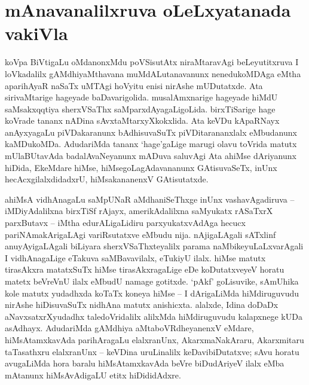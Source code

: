\makeatletter
\def\@makechapterhead#1{%
  \vspace*{10\p@}%
{\fontsize{13pt}{13pt}\selectfont\raggedright{\bf  bArfbarA vADfR jAkfsanf}\par}
\vspace*{25\p@}%
  {\parindent \z@ \centering \normalfont
    \ifnum \c@secnumdepth >\m@ne
      \if@mainmatter
        {\LARGE\bfseries  #1}\par\nobreak
	\vskip 4pt
      \fi
    \fi
\smallskip 

 \vskip 10\p@  
{\fontsize{12pt}{12pt}\selectfont\raggedleft{anu: \bf pu.ti.na.}\par}
  }
\vskip 40\p@}
\makeatother


\chapter{mAnavanalilxruva oLeLxyatanada vakiVla}\label{chap1}



koVpa BiVtigaLu oMdanonxMdu poVSisutAtx niraMtaravAgi beLeyutitxruva I loVka\-dalilx gAMdhiyaMthavana muMdALutanavanunx nenedukoMDAga eMtha aparihAyaR naSaTx uMTAgi hoVyitu enisi nirAshe mUDutatxde. Ata sirivaMtarige hageyade baDavari\-golida. musalAmxnarige hageyade hiMdU saMsakxqqtiya sherxVSaThx saMparxdA\-yagaLi\-goLida. birxTiSarige hage koVrade tananx nADina sAvxtaMtarxyXkokxlida. Ata keVDu kApaRNayx anAyxyagaLu piVDakaranunx bAdhisuvaSuTx piVDitarananxlalx eMbudanunx kaMDukoMDa. AdudariMda tananx `hage'gaLige marugi olavu toVrida matutx mUlaBUtavAda badalAvaNeyanunx mADuva saluvAgi Ata ahiMse dAriyanunx hiDida, EkeMdare hiMse, hiMsegoLagAdavananunx GAtisuvaSeTx, inUnx hecAcxgilalxdidadxrU, hiMsakananenxV GAtisutatxde.

ahiMsA vidhAnagaLu saMpUNaR aMdhaniSeThxge inUnx vashavAgadiruva -- iMDiyAdalilxna birxTiSf rAjayx, amerikAdalilxna saMyukatx rASaTxrX parxButavx -- iMtha edurALigaLidiru parxyukatxvAdAga hecucx pariNAmakArigaLAgi variRsutatxve eMbudu nija. nAjigaLAgali sATxlinf anuyAyigaLAgali biLiyara sherxVSaThxteyalilx parama naMbikeyuLaLxvarAgali I vidhAnagaLige eTakuva saMBavavilalx, eTukiyU ilalx. hiMse matutx tirasAkxra matatxSuTx hiMse tirasAkxragaLige eDe koDutatxveyeV horatu matetx beVreVnU ilalx eMbudU namage gotitxde. `pAkf' goLisuvike, sAmUhika kole matutx yudadhxda koTaTx koneya hiMse -- I dArigaLiMda hiMdiruguvudu nirAshe hiDisuvaSuTx nidhAna matutx anishicxta. alalxde, Idina doDaDx aNavxsatxrXyudadhx taledoVridalilx alilxMda hiMdiruguvudu kalapxnege kUDa asAdhayx. AdudariMda gAMdhiya aMtaboVRdheyanenxV eMdare, hiMsAtamxkavAda parihAragaLu elalxranUnx, AkarxmaNakAraru, Akarxmitaru taTasathxru elalxranUnx -- keVDina uruLinalilx  keDavibiDutatxve; sAvu horatu avugaLiMda hora baralu hiMsAtamxkavAda beVre biDudAriyeV ilalx eMba mAtanunx hiMsAvAdigaLU etitx hiDididAdxre.

